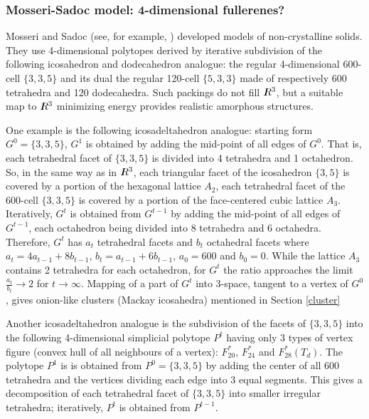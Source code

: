 \subsubsection{Mosseri-Sadoc model: 4-dimensional fullerenes?}\label{4d}
{\sc Mosseri and Sadoc} (see, for example, \cite{ms90b,msbook}) developed
models of non-crystalline solids. They use 4-dimensional polytopes derived
by iterative subdivision of the following icosahedron and dodecahedron
analogue: the regular 4-dimensional 600-cell $\{3,3,5\}$ and its dual the regular
120-cell $\{5,3,3\}$ made of respectively 600 tetrahedra and 120 dodecahedra. Such
packings do not fill $I\hspace{-1.7mm}R^{3}$, but a suitable map to $I\hspace{-1.7mm}R^{3}$
minimizing energy provides realistic amorphous structures.

One example is the following icosadeltahedron analogue: starting form
$G^0=\{3,3,5\}$, $G^1$ is obtained by adding the mid-point of all edges of
$G^0$. That is, each tetrahedral facet of $\{3,3,5\}$ is divided into 4 tetrahedra and
1 octahedron. So, in the same way as in $I\hspace{-1.7mm}R^{3}$, each triangular facet of
the icosahedron $\{3,5\}$ is covered by a portion of the hexagonal lattice $A_2$,
each tetrahedral facet of the 600-cell $\{3,3,5\}$ is covered by a portion of the
face-centered cubic lattice $A_3$. Iteratively, $G^t$ is obtained from $G^{t-1}$ by adding
the mid-point of all edges of $G^{t-1}$, each octahedron being divided into 8 tetrahedra
and 6 octahedra. Therefore, $G^t$ has $a_t$ tetrahedral facets and $b_t$
octahedral facets where
$a_t=4a_{t-1}+8b_{t-1}$,
$b_t=a_{t-1}+6b_{t-1}$,
$a_{0}=600$ and $b_{0}=0$.
While the lattice $A_3$ contains 2 tetrahedra for each octahedron, for $G^t$
the ratio approaches the limit $\frac{a_{t}}{b_{t}}\to 2$ for $t\to\infty$.
Mapping of a part of $G^t$ into 3-space, tangent to a vertex of $G^0$,
gives onion-like clusters (Mackay icosahedra) mentioned in Section \ref{cluster}

Another icosadeltahedron analogue is the subdivision of the facets of $\{3,3,5\}$
into the following 4-dimensional simplicial polytope $P^t$ having only 3 types of
vertex figure (convex hull of all neighbours of a vertex): $F^*_{20}$, $F^*_{24}$
and $F^*_{28}(T_d)$. The polytope $P^1$ is is obtained from $P^{0}=\{3,3,5\}$
by adding the center of all $600$ tetrahedra and the vertices dividing each edge
into 3 equal segments. This gives a decomposition of each tetrahedral facet of
$\{3,3,5\}$ into smaller irregular tetrahedra; iteratively, $P^t$ is obtained
from $P^{t-1}$.

